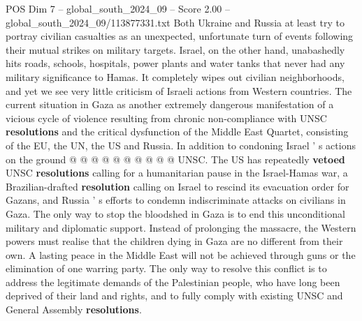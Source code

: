 \begin{textsample}{POS Dim 7 – global\_south\_2024\_09 – Score 2.00 – global\_south\_2024\_09/113877331.txt}
Both Ukraine and Russia at least try to portray civilian casualties as an unexpected, unfortunate turn of events following their mutual strikes on military targets.
Israel, on the other hand, unabashedly hits roads, schools, hospitals, power plants and water tanks that never had any military significance to Hamas.
It completely wipes out civilian neighborhoods, and yet we see very little criticism of Israeli actions from Western countries.
The current situation in Gaza as another extremely dangerous manifestation of a vicious cycle of violence resulting from chronic non-compliance with UNSC \textbf{resolutions} and the critical dysfunction of the Middle East Quartet, consisting of the EU, the UN, the US and Russia.
In addition to condoning Israel ' s actions on the ground @ @ @ @ @ @ @ @ @ @ UNSC.
The US has repeatedly \textbf{vetoed} UNSC \textbf{resolutions} calling for a humanitarian pause in the Israel-Hamas war, a Brazilian-drafted \textbf{resolution} calling on Israel to rescind its evacuation order for Gazans, and Russia ' s efforts to condemn indiscriminate attacks on civilians in Gaza.
The only way to stop the bloodshed in Gaza is to end this unconditional military and diplomatic support.
Instead of prolonging the massacre, the Western powers must realise that the children dying in Gaza are no different from their own.
A lasting peace in the Middle East will not be achieved through guns or the elimination of one warring party.
The only way to resolve this conflict is to address the legitimate demands of the Palestinian people, who have long been deprived of their land and rights, and to fully comply with existing UNSC and General Assembly \textbf{resolutions}.

\end{textsample}
